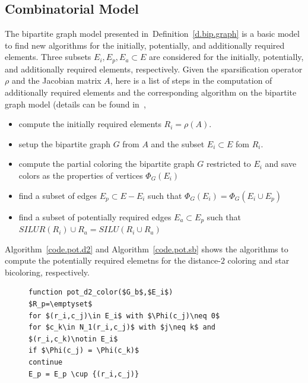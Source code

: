 \documentclass[12pt, twoside]{book}
\newcommand{\defref}[1]{Definition~\protect\ref{#1}}
\newcommand{\coderef}[1]{Algorithm~\protect\ref{#1}}
\begin{document}
\subsection{Combinatorial Model}
\label{ss.comb.precond}
The bipartite graph model presented in~\defref{d.bip.graph} is
a basic model to find new algorithms for the initially, potentially,
and additionally required elements. Three subsets $E_i, E_p, E_a\subset E$
are considered for the initially, potentially,
and additionally required elements, respectively.
Given the sparsification operator $\rho$ and the Jacobian matrix $A$,
here is a list of steps in the computation of additionally required elements
and the corresponding algorithm on the bipartite graph model
(details can be found in~\cite{Lulfesmann2012Fap},
\begin{itemize}
\item compute the initially required elements $R_i = \rho(A)$.
\item setup the bipartite graph $G$ from $A$ and the subset $E_i\subset E$ fom $R_i$.
\item compute the partial coloring the bipartite graph $G$ restricted to $E_i$
and save colors as the properties of vertices $\Phi_{G}(E_i)$
\item find a subset of edges $E_p\subset E - E_i$ such that $\Phi_{G}(E_i) = \Phi_{G}(E_i \cup E_p)$
\item find a subset of potentially required edges $E_a\subset E_p$ such
that $SILUR(R_i) \cup R_a = SILU(R_i \cup R_a)$
\end{itemize}
\coderef{code.pot.d2} and \coderef{code.pot.sb} shows the algorithms to compute the
potentially required elemetns for the distance-$2$ coloring and star bicoloring, respectively.
\begin{figure}
\begin{lstlisting}[caption=Find potentially required elements for
distance-$2$ coloring,label=code.pot.d2,mathescape]
function pot_d2_color($G_b$,$E_i$)
$R_p=\emptyset$
for $(r_i,c_j)\in E_i$ with $\Phi(c_j)\neq 0$
for $c_k\in N_1(r_i,c_j)$ with $j\neq k$ and $(r_i,c_k)\notin E_i$
if $\Phi(c_j) = \Phi(c_k)$
continue
E_p = E_p \cup {(r_i,c_j)}
\end{lstlisting}
\end{figure}
\end{document}
